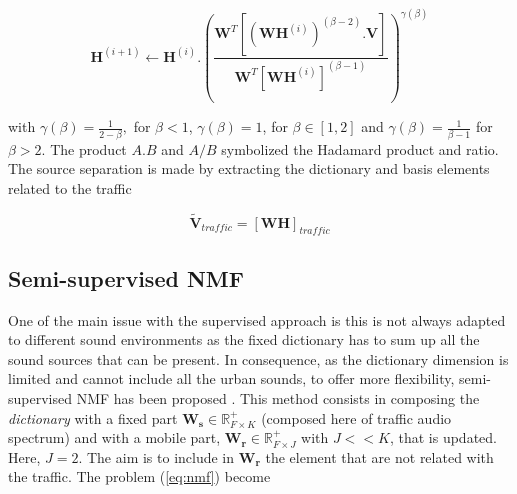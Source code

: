 \documentclass[twocolumn,a4paper,10pt]{article}
\begin{document}
\begin{equation}
\textbf{H}^{(i+1)} \leftarrow \textbf{H}^{(i)}.\left(\frac{\textbf{W}^T \left[\left(\textbf{WH}^{(i)} \right)^{(\beta-2)}.\textbf{V} \right]}{\textbf{W}^T \left[\textbf{WH}^{(i)} \right]^{(\beta-1)}}\right)^{\gamma(\beta)}
\end{equation}

with $\gamma(\beta) = \frac{1}{2-\beta},$ for $\beta < 1$, $ \gamma(\beta) = 1$, for $\beta \in \left[1,2\right]$ and $\gamma(\beta) = \frac{1}{\beta-1}$ for $\beta > 2$. The product $A.B$ and $A/B$ symbolized the Hadamard product and ratio. The source separation is made by extracting the dictionary and basis elements related to the traffic

\begin{equation}\label{eq:separationExtraction}
\mathbf{\tilde{V}}_{traffic} = \left[ \mathbf{WH} \right]_{traffic}
\end{equation}

%
%
%

\subsection{Semi-supervised NMF}

One of the main issue with the supervised approach is this is not always adapted to different sound environments as the fixed dictionary has to sum up all the sound sources that can be present. In consequence, as the dictionary dimension is limited and cannot include all the urban sounds, to offer more flexibility, semi-supervised NMF has been proposed \cite{lee_semi-supervised_2010}. This method consists in composing the \textit{dictionary} with a fixed part $\mathbf{W_s} \in \mathbb{R}^+_{F\times K}$ (composed here of traffic audio spectrum) and with a mobile part, $\mathbf{W_r} \in \mathbb{R}^+_{F\times J}$ with $J <<K$, that is updated. Here, $J = 2$. The aim is to include in $\mathbf{W_r}$ the element that are not related with the traffic. The problem (\ref{eq:nmf}) become
\end{document}
